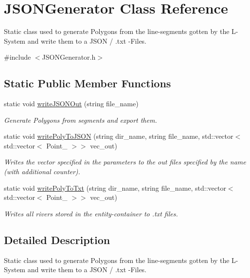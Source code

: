 \hypertarget{class_j_s_o_n_generator}{}\section{J\+S\+O\+N\+Generator Class Reference}
\label{class_j_s_o_n_generator}


Static class used to generate Polygons from the line-\/segments gotten by the L-\/\+System and write them to a J\+S\+ON / .txt -\/\+Files.  




{\ttfamily \#include $<$J\+S\+O\+N\+Generator.\+h$>$}

\subsection*{Static Public Member Functions}
\begin{DoxyCompactItemize}
\item 
static void \hyperlink{class_j_s_o_n_generator_a74a484947b0a0fd18b5d89b09709850e}{write\+J\+S\+O\+N\+Out} (string file\+\_\+name)
\begin{DoxyCompactList}\small\item\em Generate Polygons from segments and export them. \end{DoxyCompactList}\item 
static void \hyperlink{class_j_s_o_n_generator_a25781459ecbc43c1fd555e46a8b87298}{write\+Poly\+To\+J\+S\+ON} (string dir\+\_\+name, string file\+\_\+name, std\+::vector$<$ std\+::vector$<$ Point\+\_ $>$$>$ vec\+\_\+out)
\begin{DoxyCompactList}\small\item\em Writes the vector specified in the parameters to the out files specified by the name (with additional counter). \end{DoxyCompactList}\item 
static void \hyperlink{class_j_s_o_n_generator_adfb22e7e06494e5222752ac53a7d96a5}{write\+Poly\+To\+Txt} (string dir\+\_\+name, string file\+\_\+name, std\+::vector$<$ std\+::vector$<$ Point\+\_ $>$$>$ vec\+\_\+out)
\begin{DoxyCompactList}\small\item\em Writes all rivers stored in the entity-\/container to .txt files. \end{DoxyCompactList}\end{DoxyCompactItemize}


\subsection{Detailed Description}
Static class used to generate Polygons from the line-\/segments gotten by the L-\/\+System and write them to a J\+S\+ON / .txt -\/\+Files. 

